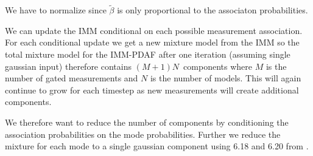 We have to normalize since $\tilde{\beta}$ is only proportional to the associaton probabilities. 

We can update the IMM conditional on each possible measurement association. For each conditional update we get a new mixture model from the IMM so the total mixture model for the IMM-PDAF after one iteration (assuming single gaussian input) therefore contains $(M+1)N$ components where $M$ is the number of gated measurements and $N$ is the number of models. This will again continue to grow for each timestep as new measurements will create additional components.

We therefore want to reduce the number of components by conditioning the association probabilities on the mode probabilities. Further we reduce the mixture for each mode to a single gaussian component using 6.18 and 6.20 from \cite{edmund}. 


